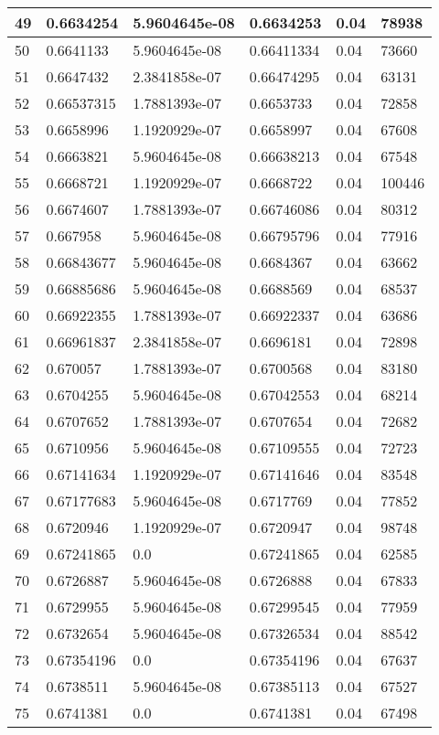 \begin{longtable}{|l|l|l|l|l|l|}
49 & 0.6634254 & 5.9604645e-08 & 0.6634253 & 0.04 & 78938 \\ \hline 
50 & 0.6641133 & 5.9604645e-08 & 0.66411334 & 0.04 & 73660 \\ \hline 
51 & 0.6647432 & 2.3841858e-07 & 0.66474295 & 0.04 & 63131 \\ \hline 
52 & 0.66537315 & 1.7881393e-07 & 0.6653733 & 0.04 & 72858 \\ \hline 
53 & 0.6658996 & 1.1920929e-07 & 0.6658997 & 0.04 & 67608 \\ \hline 
54 & 0.6663821 & 5.9604645e-08 & 0.66638213 & 0.04 & 67548 \\ \hline 
55 & 0.6668721 & 1.1920929e-07 & 0.6668722 & 0.04 & 100446 \\ \hline 
56 & 0.6674607 & 1.7881393e-07 & 0.66746086 & 0.04 & 80312 \\ \hline 
57 & 0.667958 & 5.9604645e-08 & 0.66795796 & 0.04 & 77916 \\ \hline 
58 & 0.66843677 & 5.9604645e-08 & 0.6684367 & 0.04 & 63662 \\ \hline 
59 & 0.66885686 & 5.9604645e-08 & 0.6688569 & 0.04 & 68537 \\ \hline 
60 & 0.66922355 & 1.7881393e-07 & 0.66922337 & 0.04 & 63686 \\ \hline 
61 & 0.66961837 & 2.3841858e-07 & 0.6696181 & 0.04 & 72898 \\ \hline 
62 & 0.670057 & 1.7881393e-07 & 0.6700568 & 0.04 & 83180 \\ \hline 
63 & 0.6704255 & 5.9604645e-08 & 0.67042553 & 0.04 & 68214 \\ \hline 
64 & 0.6707652 & 1.7881393e-07 & 0.6707654 & 0.04 & 72682 \\ \hline 
65 & 0.6710956 & 5.9604645e-08 & 0.67109555 & 0.04 & 72723 \\ \hline 
66 & 0.67141634 & 1.1920929e-07 & 0.67141646 & 0.04 & 83548 \\ \hline 
67 & 0.67177683 & 5.9604645e-08 & 0.6717769 & 0.04 & 77852 \\ \hline 
68 & 0.6720946 & 1.1920929e-07 & 0.6720947 & 0.04 & 98748 \\ \hline 
69 & 0.67241865 & 0.0 & 0.67241865 & 0.04 & 62585 \\ \hline 
70 & 0.6726887 & 5.9604645e-08 & 0.6726888 & 0.04 & 67833 \\ \hline 
71 & 0.6729955 & 5.9604645e-08 & 0.67299545 & 0.04 & 77959 \\ \hline 
72 & 0.6732654 & 5.9604645e-08 & 0.67326534 & 0.04 & 88542 \\ \hline 
73 & 0.67354196 & 0.0 & 0.67354196 & 0.04 & 67637 \\ \hline 
74 & 0.6738511 & 5.9604645e-08 & 0.67385113 & 0.04 & 67527 \\ \hline 
75 & 0.6741381 & 0.0 & 0.6741381 & 0.04 & 67498 \\ \hline 
\end{longtable}
